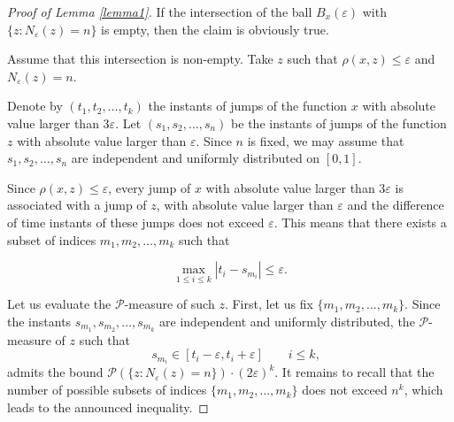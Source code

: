 \documentclass[12pt]{article}
\let\ep\varepsilon
\newcommand\PP{\mathcal P}
\newcommand\ro{\rho}
\let\le\leqslant
\theoremstyle{definition}
\begin{document}
\begin{proof} [Proof of Lemma \ref{lemma1}]

If the intersection of  the ball $B_x(\ep)$  with $\{z : N_\ep(z) = n\}$ is empty, 
then the claim is obviously true.

Assume that this intersection is non-empty. Take $z$ such that
$\ro(x, z) \le \varepsilon $ and  $N_\ep(z) = n$.  



    
Denote by $(t_1, t_2, \dots ,t_k)$ the instants of jumps of the function $x$ with absolute value larger than
$3 \ep$. Let $(s_1, s_2,\dots ,s_n)$ be the instants of jumps of the function $z$ 
with absolute value larger than $\ep$. Since  $n$ is fixed, we may assume that $s_1, s_2,\dots, s_n$ are independent and uniformly distributed on $[0,1]$.
    
 Since $\ro(x, z) \le \ep$, every jump of $x$ with absolute value larger than $3 \ep$ 
 is associated with a jump of $z$, with absolute value larger than $\ep$ and the difference of time
 instants of these jumps does not exceed $\ep$. This means that there exists a subset of indices 
 $ m_1, m_2, \dots, m_k $ such that
    
\[
    \max_{1\le i\le k} |t_i - s_{m_i}| \le \ep.
\]

Let us evaluate the $\PP$-measure of such $z$. First, let us fix     
$ \{m_1, m_2, \dots, m_k\}$. Since  the instants $s_{m_1}, s_{m_2}, \dots, s_{m_k}$ are independent and uniformly
distributed, the $\PP$-measure  of $z$ such that
\[
    \quad s_{m_i} \in [t_i - \varepsilon, t_i + \varepsilon] \qquad   i \le k, 
\]
admits the bound
$
    \PP(\{z : N_\varepsilon(z) = n\}) \cdot (2\varepsilon)^k.
$
It remains to recall that the number of possible subsets of indices    
$\{ m_1, m_2, \dots, m_k \}$ does not exceed $n^k$, which leads to the announced inequality.  

\end{proof}

\end{document}
